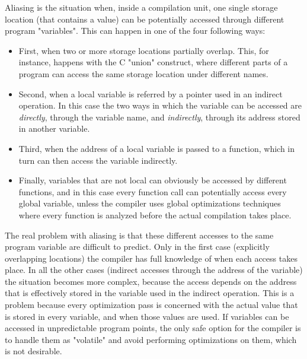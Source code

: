 Aliasing is the situation when, inside a compilation unit, one single storage location (that contains a value) can be potentially accessed through different program "variables".
This can happen in one of the four following ways:
\begin{itemize}
\item First, when two or more storage locations partially overlap. This, for instance, happens with the C "union" construct, where different parts of a program can access the same storage location under different names.
\item Second, when a local variable is referred by a pointer used in an indirect operation. In this case the two ways in which the variable can be accessed are {\em directly}, through the variable name, and {\em indirectly}, through its address stored in another variable.
\item Third, when the address of a local variable is passed to a function, which in turn can then access the variable indirectly.
\item Finally, variables that are not local can obviously be accessed by different functions, and in this case every function call can potentially access every global variable, unless the compiler uses global optimizations techniques where every function is analyzed before the actual compilation takes place.
\end{itemize}

The real problem with aliasing is that these different accesses to the same program variable are difficult to predict. Only in the first case (explicitly overlapping locations) the compiler has full knowledge of when each access takes place. In all the other cases (indirect accesses through the address of the variable) the situation becomes more complex, because the access depends on the address that is effectively stored in the variable used in the indirect operation.
This is a problem because every optimization pass is concerned with the actual value that is stored in every variable, and when those values are used. If variables can be accessed in unpredictable program points, the only safe option for the compiler is to handle them as "volatile" and avoid performing optimizations on them, which is not desirable.

